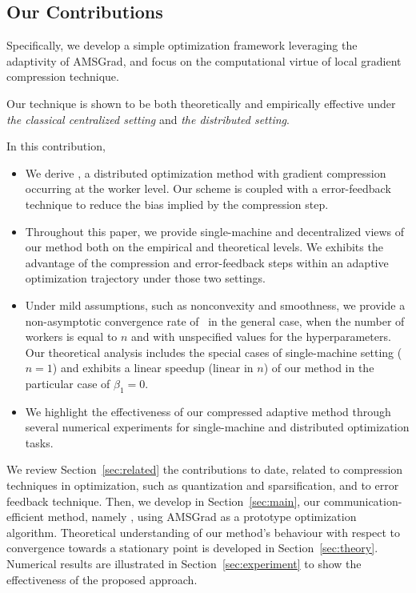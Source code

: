 \documentclass[11pt]{article}
\begin{document}
\subsection{Our Contributions}

Specifically, we develop a simple optimization framework leveraging the adaptivity of AMSGrad, and focus on the computational virtue of local gradient compression technique.

Our technique is shown to be both theoretically and empirically effective under \emph{the classical centralized setting} and \emph{the distributed setting}.

In this contribution, 
\begin{itemize}
\item We derive \algo, a distributed optimization method with gradient compression occurring at the worker level. Our scheme is coupled with a error-feedback technique to reduce the bias implied by the compression step.
\item Throughout this paper, we provide single-machine and decentralized views of our method both on the empirical and theoretical levels.
We exhibits the advantage of the compression and error-feedback steps within an adaptive optimization trajectory under those two settings.
\item Under mild assumptions, such as nonconvexity and smoothness, we provide a non-asymptotic convergence rate of \algo\ in the general case, \ie when the number of workers is equal to $n$ and with unspecified values for the hyperparameters. 
Our theoretical analysis includes the special cases of single-machine setting ($n=1$) and exhibits a linear speedup (linear in $n$) of our method in the particular case of $\beta_1 = 0$.
\item We highlight the effectiveness of our compressed adaptive method through several numerical experiments for single-machine and distributed optimization tasks.
\end{itemize}



We review Section~\ref{sec:related} the contributions to date, related to compression techniques in optimization, such as quantization and sparsification, and to error feedback technique.
Then, we develop in Section~\ref{sec:main}, our communication-efficient method, namely \algo, using AMSGrad as a prototype optimization algorithm.
Theoretical understanding of our method's behaviour with respect to convergence towards a stationary point is developed in Section~\ref{sec:theory}.
Numerical results are illustrated in Section~\ref{sec:experiment} to show the effectiveness of the proposed approach.
\end{document}
